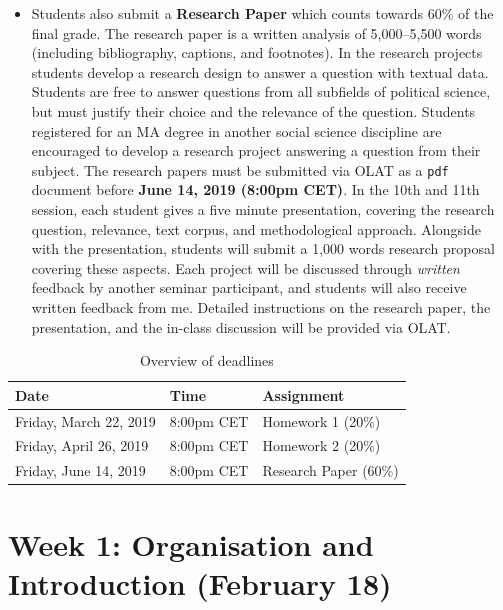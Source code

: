 \documentclass[abstract=on,parskip=full,headings=standardclasses,fontsize=11pt,paper=a4]{scrartcl}
\begin{document}
\begin{itemize}
\item Students also submit a \textbf{Research Paper} which counts towards 60\% of the final grade. The research paper is a written analysis of 5,000--5,500 words (including bibliography, captions, and footnotes). In the research projects students develop a research design to answer a question with textual data. Students are free to answer questions from all subfields of political science, but must justify their choice and the relevance of the question.  Students registered for an MA degree in another social science discipline are encouraged to develop a research project answering a question from their subject. The research papers must be submitted via OLAT as a \texttt{pdf} document before \textbf{June 14, 2019 (8:00pm CET)}. In the 10th and 11th session, each student gives a five minute presentation, covering the research question, relevance, text corpus, and methodological approach. Alongside with the presentation,  students will submit a 1,000 words research proposal covering these aspects. Each project will be discussed through \textit{written} feedback by another seminar participant, and students will also receive written feedback from me. Detailed instructions on the research paper, the presentation, and the in-class discussion will be provided via OLAT.
\end{itemize}



\begin{table}[h] \centering \onehalfspacing
\caption*{Overview of deadlines}
\begin{tabular}{ l l l} 
\toprule
Date &  Time & Assignment \\
\midrule
Friday, March 22, 2019 & 8:00pm CET &  Homework 1 (20\%)  \\
Friday, April 26, 2019 & 8:00pm CET  & Homework 2 (20\%) \\
Friday, June 14, 2019 & 8:00pm CET & Research Paper  (60\%) \\
\bottomrule
\end{tabular}
\end{table}



\tableofcontents

\newpage

\section{Week 1: Organisation and Introduction (February 18)}
\end{document}
